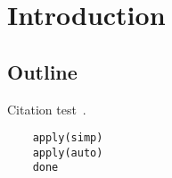 
\chapter{Introduction}\label{chapter:introduction}

\section{Outline}
Citation test~\parencite{latex}.





  \begin{lstlisting}
    apply(simp)
    apply(auto)
    done
  \end{lstlisting}
